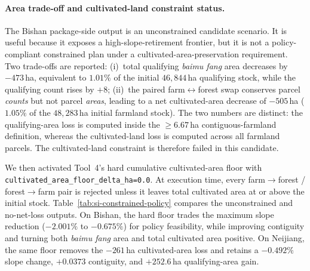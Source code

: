 \documentclass[11pt]{article}
\begin{document}
\paragraph{Area trade-off and cultivated-land constraint status.} The Bishan package-side output is an unconstrained candidate scenario. It is useful because it exposes a high-slope-retirement frontier, but it is not a policy-compliant constrained plan under a cultivated-area-preservation requirement. Two trade-offs are reported: (i)~total qualifying \textit{baimu fang} area decreases by $-473$\,ha, equivalent to $1.01\%$ of the initial $46{,}844$\,ha qualifying stock, while the qualifying count rises by $+8$; (ii)~the paired farm$\leftrightarrow$forest swap conserves parcel \emph{counts} but not parcel \emph{areas}, leading to a net cultivated-area decrease of $-505$\,ha ($1.05\%$ of the $48{,}283$\,ha initial farmland stock). The two numbers are distinct: the qualifying-area loss is computed inside the $\geq 6.67$\,ha contiguous-farmland definition, whereas the cultivated-land loss is computed across all farmland parcels. The cultivated-land constraint is therefore failed in this candidate.

We then activated Tool~4's hard cumulative cultivated-area floor with \texttt{cultivated\_area\_floor\_delta\_ha=0.0}. At execution time, every farm$\to$forest / forest$\to$farm pair is rejected unless it leaves total cultivated area at or above the initial stock. Table~\ref{tab:si-constrained-policy} compares the unconstrained and no-net-loss outputs. On Bishan, the hard floor trades the maximum slope reduction ($-2.001\%$ to $-0.675\%$) for policy feasibility, while improving contiguity and turning both \textit{baimu fang} area and total cultivated area positive. On Neijiang, the same floor removes the $-261$\,ha cultivated-area loss and retains a $-0.492\%$ slope change, $+0.0373$ contiguity, and $+252.6$\,ha qualifying-area gain.
\end{document}
